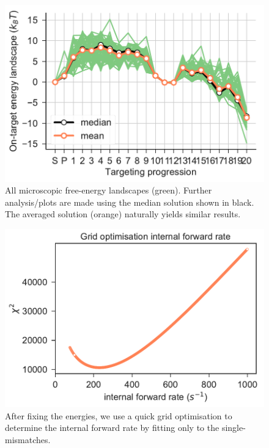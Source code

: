 \documentclass[a4paper,twoside]{revtex4-1}
\begin{document}
\begin{figure}[H]
\centering
\includegraphics[scale=0.5]{fig4_15_11_2018.pdf}
\caption{All microscopic free-energy landscapes (green). Further analysis/plots are made using the median solution shown in black. The averaged solution (orange) naturally yields similar results.}
\end{figure}

\begin{figure}[H]
\centering
\includegraphics[scale=0.5]{fig5_15_11_2018.pdf}
\caption{After fixing the energies, we use a quick grid optimisation to determine the internal forward rate by fitting only to the single-mismatches.}
\end{figure}
\end{document}
